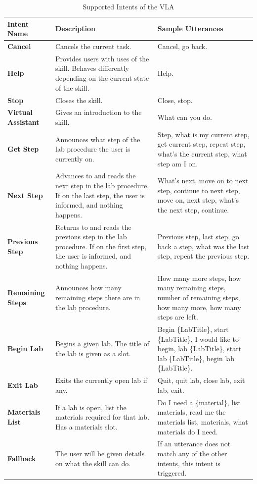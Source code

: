 \documentclass[11.5pt]{sig-alternate} %
\begin{document}
\begin{large}
\begin{table}[t!]
\caption{Supported Intents of the VLA}
\begin{tabular}{|l|l|l|}
\hline
\textbf{Intent Name} & \textbf{Description} & \textbf{Sample Utterances} \\ \hline
\textbf{Cancel} & Cancels the current task. & Cancel, go back. \\ \hline
\textbf{Help} & Provides users with uses of the skill. Behaves differently depending on the current state of the skill. & Help. \\ \hline
\textbf{Stop} & Closes the skill. & Close, stop. \\ \hline
\textbf{Virtual Assistant} & Gives an introduction to the skill. & What can you do. \\ \hline
\textbf{Get Step} & Announces what step of the lab procedure the user is currently on. & Step, what is my current step, get current step, repeat step, what's the current step, what step am I on. \\ \hline
\textbf{Next Step} & Advances to and reads the next step in the lab procedure. If on the last step, the user is informed, and nothing happens. & What’s next, move on to next step, continue to next step, move on, next step, what’s the next step, continue. \\ \hline
\textbf{Previous Step} & Returns to and reads the previous step in the lab procedure. If on the first step, the user is informed, and nothing happens. & Previous step, last step, go back a step, what was the last step, repeat the previous step. \\ \hline
\textbf{Remaining Steps} & Announces how many remaining steps there are in the lab procedure. & How many more steps, how many remaining steps, number of remaining steps, how many more, how many steps are left. \\ \hline
\textbf{Begin Lab} & Begins a given lab. The title of the lab is given as a slot. & Begin \{LabTitle\}, start \{LabTitle\}, I would like to begin, lab \{LabTitle\}, start lab \{LabTitle\}, begin lab \{LabTitle\}. \\ \hline
\textbf{Exit Lab} & Exits the currently open lab if any. & Quit, quit lab, close lab, exit lab, exit. \\ \hline
\textbf{Materials List} & If a lab is open, list the materials required for that lab. Has a materials slot. & Do I need a \{material\}, list materials, read me the materials list, materials, what materials do I need. \\ \hline
\textbf{Fallback} & The user will be given details on what the skill can do. & If an utterance does not match any of the other intents, this intent is triggered. \\ \hline
\end{tabular}
\end{table}


\end{large}
\end{document}
